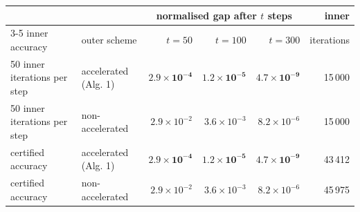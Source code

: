 \begin{tabular}{llrrrr}
\toprule
 & & \multicolumn{3}{c}{normalised gap after $t$ steps} & inner \\
\cmidrule(lr){3-5}
inner accuracy & outer scheme & $t=50$ & $t=100$ & $t=300$ & iterations \\
\midrule
50 inner iterations per step & accelerated (Alg. 1) & $\mathbf{2.9\times10^{-4}}$ & $\mathbf{1.2\times10^{-5}}$ & $\mathbf{4.7\times10^{-9}}$ & 15\,000 \\
50 inner iterations per step & non-accelerated & $2.9\times10^{-2}$ & $3.6\times10^{-3}$ & $8.2\times10^{-6}$ & 15\,000 \\
certified accuracy & accelerated (Alg. 1) & $\mathbf{2.9\times10^{-4}}$ & $\mathbf{1.2\times10^{-5}}$ & $\mathbf{4.7\times10^{-9}}$ & 43\,412 \\
certified accuracy & non-accelerated & $2.9\times10^{-2}$ & $3.6\times10^{-3}$ & $8.2\times10^{-6}$ & 45\,975 \\
\bottomrule
\end{tabular}
